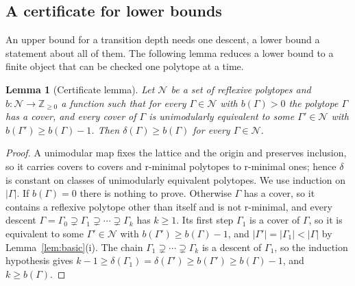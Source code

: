 \documentclass[manuscript]{aomart}
\newtheorem{lemma}[theorem]{Lemma}
\theoremstyle{definition}
\theoremstyle{remark}
\begin{document}
\subsection{A certificate for lower bounds}\label{ssec:certificate}

An upper bound for a transition depth needs one descent, a lower bound a
statement about all of them. The following lemma reduces a lower bound to
a finite object that can be checked one polytope at a time.

\begin{lemma}[Certificate lemma]\label{lem:certificate}
Let $\mathcal{N}$ be a set of reflexive polytopes and
$b\colon\mathcal{N}\to\mathbb{Z}_{\ge0}$ a function such that for every
$\Gamma\in\mathcal{N}$ with $b(\Gamma)>0$ the polytope $\Gamma$ has a
cover, and every cover of $\Gamma$ is unimodularly equivalent to some
$\Gamma'\in\mathcal{N}$ with $b(\Gamma')\ge b(\Gamma)-1$. Then
$\delta(\Gamma)\ge b(\Gamma)$ for every $\Gamma\in\mathcal{N}$.
\end{lemma}

\begin{proof}
A unimodular map fixes the lattice and the origin and preserves inclusion,
so it carries covers to covers and r-minimal polytopes to r-minimal ones;
hence $\delta$ is constant on classes of unimodularly equivalent
polytopes. We use induction on $|\Gamma|$. If $b(\Gamma)=0$ there is
nothing to prove. Otherwise $\Gamma$ has a cover, so it contains a
reflexive polytope other than itself and is not r-minimal, and every
descent $\Gamma=\Gamma_0\supsetneq\Gamma_1\supsetneq\cdots\supsetneq
\Gamma_k$ has $k\ge1$. Its first step $\Gamma_1$ is a cover of $\Gamma$,
so it is equivalent to some $\Gamma'\in\mathcal{N}$ with $b(\Gamma')\ge
b(\Gamma)-1$, and $|\Gamma'|=|\Gamma_1|<|\Gamma|$ by
Lemma~\ref{lem:basic}(i). The chain $\Gamma_1\supsetneq\cdots\supsetneq
\Gamma_k$ is a descent of $\Gamma_1$, so the induction hypothesis gives
$k-1\ge\delta(\Gamma_1)=\delta(\Gamma')\ge b(\Gamma')\ge b(\Gamma)-1$, and
$k\ge b(\Gamma)$.
\end{proof}
\end{document}
